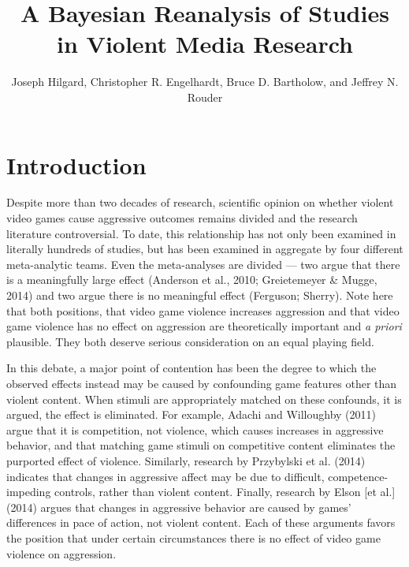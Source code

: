 \documentclass[fignum,nobf,man]{apa}
\author{Joseph Hilgard, Christopher R. Engelhardt, Bruce D. Bartholow, and Jeffrey N. Rouder}
\title{A Bayesian Reanalysis of Studies in Violent Media Research}
\affiliation{University of Missouri}
\begin{document}
\maketitle

\section*{Introduction}
Despite more than two decades of research, scientific opinion on whether violent video games cause aggressive outcomes remains divided and the research literature controversial. To date, this relationship has not only been examined in literally hundreds of studies, but has been examined in aggregate by four different meta-analytic teams. Even the meta-analyses are divided --- two argue that there is a meaningfully large effect (Anderson et al., 2010; Greietemeyer \& Mugge, 2014) and two argue there is no meaningful effect (Ferguson; Sherry). Note here that both positions, that video game violence increases aggression and that video game violence has no effect on aggression are theoretically important and \textit{a priori} plausible.  They both deserve serious consideration on an equal playing field.

In this debate, a major point of contention has been the degree to which the observed effects instead may be caused by confounding game features other than violent content. When stimuli are appropriately matched on these confounds, it is argued, the effect is eliminated. For example, Adachi and Willoughby (2011) argue that it is competition, not violence, which causes increases in aggressive behavior, and that matching game stimuli on competitive content eliminates the purported effect of violence. Similarly, research by Przybylski et al. (2014) indicates that changes in aggressive affect may be due to difficult, competence-impeding controls, rather than violent content. 
Finally, research by Elson [et al.] (2014) argues that changes in aggressive behavior are caused by games’ differences in pace of action, not violent content. Each of these arguments favors the position that under certain circumstances there is no effect of video game violence on aggression.
\end{document}
